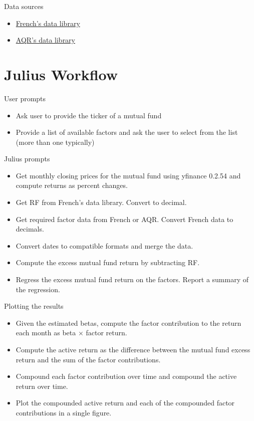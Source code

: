 \documentclass[10pt]{beamer}
\begin{document}
\begin{frame}{Data sources}
    \begin{itemize}
    \item \href{https://mba.tuck.dartmouth.edu/pages/faculty/ken.french/data_library.html}{French's data library}
    \item \href{https://www.aqr.com/library/data-sets}{AQR's data library}
    \end{itemize}
\end{frame}

\section{Julius Workflow}

\begin{frame}{User prompts}
    \begin{itemize}
\item Ask user to provide the ticker of a mutual fund 
\item Provide a list of available factors and ask the user to select from the list (more than one typically)
    \end{itemize}
\end{frame}

\begin{frame}{Julius prompts}
\begin{itemize}
\item Get monthly closing prices for the mutual fund using yfinance 0.2.54 and compute returns as percent changes.
\item Get RF from French's data library.  Convert to decimal.
\item Get required factor data from French or AQR.  Convert French data to decimals.
\item Convert dates to compatible formats and merge the data.
\item Compute the excess mutual fund return by subtracting RF.
\item Regress the excess mutual fund return on the factors.  Report a summary of the regression.
\end{itemize}
\end{frame}

\begin{frame}{Plotting the results}
\begin{itemize}
\item Given the estimated betas, compute the factor contribution to the return each month as beta $\times$ factor return.
\item Compute the active return as the difference between the mutual fund excess return and the sum of the factor contributions.
\item Compound each factor contribution over time and compound the active return over time.
\item Plot the compounded active return and each of the compounded factor contributions in a single figure.
\end{itemize}
\end{frame}
\end{document}
